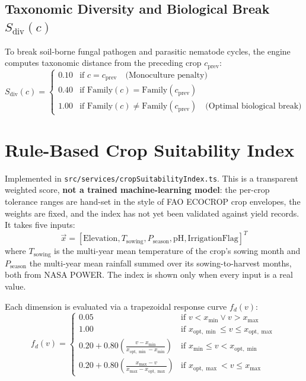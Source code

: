 \documentclass[11pt,a4paper]{report}
\begin{document}
\subsection{Taxonomic Diversity and Biological Break $S_{\text{div}}(c)$}
To break soil-borne fungal pathogen and parasitic nematode cycles, the engine computes taxonomic distance from the preceding crop $c_{\text{prev}}$:
\begin{equation}
  S_{\text{div}}(c) = \begin{cases}
    0.10 & \text{if } c = c_{\text{prev}} \quad \text{(Monoculture penalty)} \\
    0.40 & \text{if } \text{Family}(c) = \text{Family}(c_{\text{prev}}) \\
    1.00 & \text{if } \text{Family}(c) \ne \text{Family}(c_{\text{prev}}) \quad \text{(Optimal biological break)}
  \end{cases}
\end{equation}

\section{Rule-Based Crop Suitability Index}
Implemented in \texttt{src/services/cropSuitabilityIndex.ts}. This is a transparent weighted score, \textbf{not a trained machine-learning model}: the per-crop tolerance ranges are hand-set in the style of FAO ECOCROP crop envelopes, the weights are fixed, and the index has not yet been validated against yield records. It takes five inputs:
\begin{equation}
  \vec{x} = [\text{Elevation}, T_{\text{sowing}}, P_{\text{season}}, \text{pH}, \text{IrrigationFlag}]^T
\end{equation}
where $T_{\text{sowing}}$ is the multi-year mean temperature of the crop's sowing month and $P_{\text{season}}$ the multi-year mean rainfall summed over its sowing-to-harvest months, both from NASA POWER. The index is shown only when every input is a real value.

Each dimension is evaluated via a trapezoidal response curve $f_d(v)$:
\begin{equation}
  f_d(v) = \begin{cases}
    0.05 & \text{if } v < x_{\min} \lor v > x_{\max} \\
    1.00 & \text{if } x_{\text{opt},\min} \le v \le x_{\text{opt},\max} \\
    0.20 + 0.80 \left( \frac{v - x_{\min}}{x_{\text{opt},\min} - x_{\min}} \right) & \text{if } x_{\min} \le v < x_{\text{opt},\min} \\
    0.20 + 0.80 \left( \frac{x_{\max} - v}{x_{\max} - x_{\text{opt},\max}} \right) & \text{if } x_{\text{opt},\max} < v \le x_{\max}
  \end{cases}
\end{equation}
\end{document}
